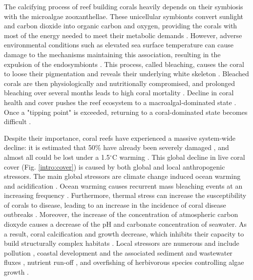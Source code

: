 The calcifying process of reef building corals heavily depends on their symbiosis with the microalgae zooxanthellae. These unicellular symbionts convert sunlight and carbon dioxide into organic carbon and oxygen, providing the corals with most of the energy needed to meet their metabolic demands \citep{muscatine1977reef}. However, adverse environmental conditions such as elevated sea surface temperature can cause damage to the mechanisms maintaining this association, resulting in the expulsion of the endosymbionts \citep{hoegh2007coral,van2022global}. This process, called bleaching, causes the coral to loose their pigmentation and reveals their underlying white skeleton \citep{baker2008climate}. Bleached corals are then physiologically and nutritionally compromised, and prolonged bleaching over several months leads to high coral mortality \citep{hughes2018spatial}. Decline in coral health and cover pushes the reef ecosystem to a macroalgal-dominated state \citep{hughes2003climate,mumby2007thresholds}. Once a "tipping point" is exceeded, returning to a coral-dominated state becomes difficult \citep{mumby2007thresholds,graham2015predicting}.

Despite their importance, coral reefs have experienced a massive system-wide decline: it is estimated  that 50\% have already been severely damaged \citep{hoegh2019people}, and almost all could be lost under a 1.5$^\circ$C warming \citep{dixon2022future}. This global decline in live coral cover \citep{gardner2003long,pandolfi2003global,pandolfi2011projecting,perry2013caribbean,dietzel2021population} (Fig. \ref{intro:cover}) is caused by both global and local anthropogenic stressors. The main global stressors are climate change induced ocean warming and acidification \citep{dove2020ocean,figueiredo2021global,dixon2022future}. Ocean warming causes recurrent mass bleaching events at an increasing frequency \citep{connell199730, hughes2018spatial,van2022global}. Furthermore, thermal stress can increase the susceptibility of corals to disease, leading to an increase in the incidence of coral disease outbreaks \citep{harvell2002climate,bruno2007thermal,muller2012caribbean,howells2020annual}. Moreover, the increase of the concentration of atmospheric carbon dioxyde causes a decrease of the pH and carbonate concentration of seawater. As a result, coral calcification and growth decrease, which inhibits their capacity to build structurally complex habitats \citep{hoegh2007coral,albright2016reversal}. Local stressors are numerous and include pollution \citep{loya1980effects,van2011chemical}, coastal development and the associated sediment and wastewater fluxes \citep{erftemeijer2012environmental, jones2015effects,jones2019sediment,cunning2019extensive}, nutrient run-off \citep{hughes2003climate,fabricius2005effects}, and overfishing of herbivorous species controlling algae growth \citep{jackson2001historical,shantz2020overfishing}.

